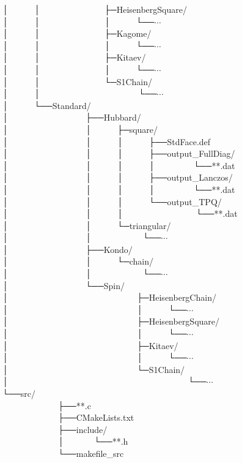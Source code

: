 │~~~~~~│~~~~~~~~~~~~~~~├─HeisenbergSquare/\\
│~~~~~~│~~~~~~~~~~~~~~~│~~~~~~└──$\cdots$\\
│~~~~~~│~~~~~~~~~~~~~~~├─Kagome/\\
│~~~~~~│~~~~~~~~~~~~~~~│~~~~~~└──$\cdots$\\
│~~~~~~│~~~~~~~~~~~~~~~├─Kitaev/\\
│~~~~~~│~~~~~~~~~~~~~~~│~~~~~~└──$\cdots$\\
│~~~~~~│~~~~~~~~~~~~~~~└─S1Chain/\\
│~~~~~~│~~~~~~~~~~~~~~~~~~~~~~~└──$\cdots$\\
│~~~~~~└──Standard/\\
│~~~~~~~~~~~~~~~~~~├──Hubbard/\\
│~~~~~~~~~~~~~~~~~~│~~~~~~├─square/\\
│~~~~~~~~~~~~~~~~~~│~~~~~~│~~~~~~├──StdFace.def\\
│~~~~~~~~~~~~~~~~~~│~~~~~~│~~~~~~├──output\_FullDiag/\\
│~~~~~~~~~~~~~~~~~~│~~~~~~│~~~~~~│~~~~~~~~~└──**.dat\\
│~~~~~~~~~~~~~~~~~~│~~~~~~│~~~~~~├──output\_Lanczos/\\
│~~~~~~~~~~~~~~~~~~│~~~~~~│~~~~~~│~~~~~~~~~└──**.dat\\
│~~~~~~~~~~~~~~~~~~│~~~~~~│~~~~~~└──output\_TPQ/\\
│~~~~~~~~~~~~~~~~~~│~~~~~~│~~~~~~~~~~~~~~~~~└──**.dat\\
│~~~~~~~~~~~~~~~~~~│~~~~~~└─triangular/\\
│~~~~~~~~~~~~~~~~~~│~~~~~~~~~~~~└──$\cdots$\\
│~~~~~~~~~~~~~~~~~~├──Kondo/\\
│~~~~~~~~~~~~~~~~~~│~~~~~~└─chain/\\
│~~~~~~~~~~~~~~~~~~│~~~~~~~~~~~~└──$\cdots$\\
│~~~~~~~~~~~~~~~~~~└──Spin/\\
│~~~~~~~~~~~~~~~~~~~~~~~~~~~~~~├─HeisenbergChain/\\
│~~~~~~~~~~~~~~~~~~~~~~~~~~~~~~│~~~~~~└──$\cdots$\\
│~~~~~~~~~~~~~~~~~~~~~~~~~~~~~~├─HeisenbergSquare/\\
│~~~~~~~~~~~~~~~~~~~~~~~~~~~~~~│~~~~~~└──$\cdots$\\
│~~~~~~~~~~~~~~~~~~~~~~~~~~~~~~├─Kitaev/\\
│~~~~~~~~~~~~~~~~~~~~~~~~~~~~~~│~~~~~~└──$\cdots$\\
│~~~~~~~~~~~~~~~~~~~~~~~~~~~~~~└─S1Chain/\\
│~~~~~~~~~~~~~~~~~~~~~~~~~~~~~~~~~~~~~~~~~~└──$\cdots$\\
└──src/\\
~~~~~~~~~~~~~├──**.c\\
~~~~~~~~~~~~~├──CMakeLists.txt\\
~~~~~~~~~~~~~├──include/\\
~~~~~~~~~~~~~│~~~~~~~└──**.h\\
~~~~~~~~~~~~~└──makefile\_src\\

